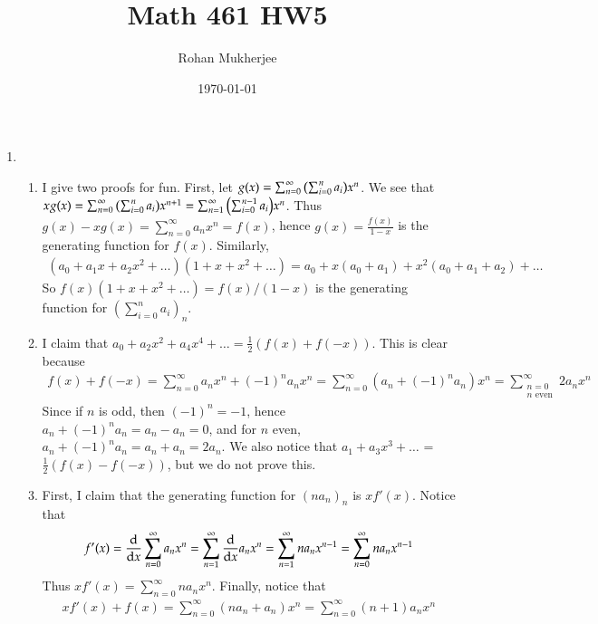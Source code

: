 \documentclass[12pt]{article}
\title{Math 461 HW5}
\date{\today}
\author{Rohan Mukherjee}
\theoremstyle{definitionstyle}
\begin{document}
	\maketitle
	\begin{enumerate}[leftmargin=\labelsep]
		\item \begin{enumerate}
			\item I give two proofs for fun. First, let $g(x) = \sum_{n=0}^\infty \qty(\sum_{i=0}^n a_i) x^n$. We see that $xg(x) = \sum_{n=0}^\infty \qty(\sum_{i=0}^n a_i) x^{n+1} = \sum_{n=1}^\infty \qty(\sum_{i=0}^{n-1} a_i) x^n$. Thus $g(x) - xg(x) = \sum_{n=0}^\infty a_nx^n = f(x)$, hence $g(x) = \frac{f(x)}{1-x}$ is the generating function for $f(x)$. Similarly,
			\begin{align*}
				(a_0+a_1 x + a_2 x^2 + \ldots)(1 + x + x^2 + \ldots) = a_0 + x(a_0+a_1) + x^2(a_0+a_1+a_2) + \ldots
			\end{align*}
			So $f(x)(1+x + x^2 + \ldots) = f(x)/(1-x)$ is the generating function for $(\sum_{i=0}^{n} a_i)_n$.
			
			\item I claim that $a_0 + a_2x^2 + a_4x^4 + \ldots = \frac12(f(x)+f(-x))$. This is clear because
			\begin{align*}
				f(x) + f(-x) = \sum_{n=0}^\infty a_nx^n + (-1)^n a_n x^n = \sum_{n=0}^\infty (a_n+(-1)^na_n)x^n = \sum_{\substack{n = 0 \\ n\text{ even}}}^\infty 2a_nx^n
			\end{align*}
			Since if $n$ is odd, then $(-1)^n = -1$, hence $a_n + (-1)^na_n = a_n - a_n = 0$, and for $n$ even, $a_n + (-1)^na_n = a_n + a_n = 2a_n$. We also notice that $a_1 + a_3x^3 + \ldots$ = $\frac12 (f(x)-f(-x))$, but we do not prove this.
			
			\item First, I claim that the generating function for $(na_n)_n$ is $xf'(x)$. Notice that
			\begin{align*}
				f'(x) = \dv{x} \sum_{n=0}^\infty a_nx^n = \sum_{n=1}^\infty \dv{x} a_nx^n = \sum_{n=1}^\infty na_nx^{n-1} = \sum_{n=0}^\infty na_nx^{n-1}
			\end{align*}
			Thus $xf'(x) = \sum_{n=0}^\infty na_nx^n$. Finally, notice that
			\begin{align*}
				xf'(x) + f(x) = \sum_{n=0}^\infty (na_n + a_n)x^n = \sum_{n=0}^\infty (n+1)a_nx^n
			\end{align*}
		\end{enumerate}
	

\end{enumerate}
\end{document}
